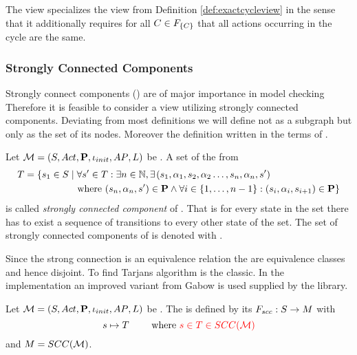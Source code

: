 \documentclass[preview]{standalone}
\begin{document}
The view specializes the view from Definition \ref{def:exactcycleview} in the sense that it additionally requires for all ${C} \in {\ensuremath{{F_{\{{C}\}}}}}$ that all actions occurring in the cycle are the same. 



\subsubsection{Strongly Connected Components}
Strongly connect components (\sccN) are of major importance in model checking 
Therefore it is feasible to consider a view utilizing strongly connected components. Deviating from most definitions we will define \sccN not as a subgraph but only as the set of its nodes. Moreover the definition written in the terms of \chosengraphtypeN.

\begin{definition}
	Let ${{{\mathcal{M}}}} = {{({S}, {Act}, {\textbf{P}}, {\iota_{init}}, {AP}, {L})}}$ be \chosengraphtypeN. A set of the from
	\begin{align*}
		{T} = \{{s}_1 \in {S} \mid & \; \forall {s}' \in {T} : \exists n \in {\mathbb{N}}, \exists \; \! ({s}_1, {\alpha}_1, {s}_2, {\alpha}_2 \dots, {s}_n, {\alpha}_n, {s}') \\
		&\text{ where } ({s}_n, {\alpha}_n, {s}') \in {\ensuremath{{\textbf{P}}}} \land \forall i \in \{1, \dots, n-1\} : ({s}_i, {\alpha}_i, {s}_{i+1}) \in {\ensuremath{{\textbf{P}}}} \}
	\end{align*}
	is called \emph{strongly connected component} of \chgph. That is for every state in the set there has to exist a sequence of transitions to every other state of the set. The set of strongly connected components of \chgph is denoted with \setscc.
\end{definition}

Since the strong connection is an equivalence relation the \sccsN are equivalence classes and hence disjoint. To find \sccsN Tarjans algorithm is the classic. In the implementation an improved variant from Gabow is used supplied by the \jgrapht library. 

\begin{definition}
	Let ${{{\mathcal{M}}}} = {{({S}, {Act}, {\textbf{P}}, {\iota_{init}}, {AP}, {L})}}$ be \chosengraphtypeN. The \viewN \viewscc is defined by its \grpfctN ${{F_{scc}}} : {S} \to {\ensuremath{{M}}}$ with
	\[
	\state \mapsto \scc \quad \quad \text{ where } \redcomment{\state \in \scc \in \setscc}
	\]
	and ${{M}} = {SCC({{{\mathcal{M}}}})}$.
\end{definition}
\end{document}
